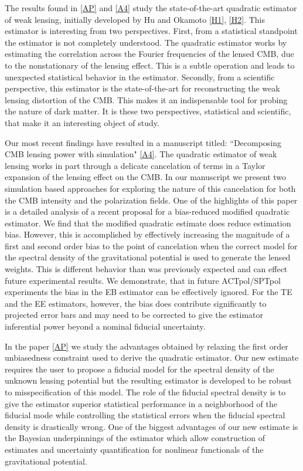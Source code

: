 \documentclass[12pt]{article}
\begin{document}
The results found in \ref{AP} and \ref{A4} study the state-of-the-art quadratic estimator of weak lensing,  initially developed by Hu and Okamoto \ref{H1}, \ref{H2}.
This estimator is interesting from two perspectives. First, from a statistical standpoint the estimator is not completely understood. The quadratic estimator works by estimating the correlation across the Fourier frequencies of the lensed CMB, due to the nonstationary of the lensing effect. This is a subtle operation and leads to unexpected statistical behavior in the estimator. Secondly, from a scientific perspective, this estimator is the state-of-the-art for reconstructing the weak lensing distortion of the CMB. This makes it an indispensable tool for probing the nature of dark matter. It is these two perspectives, statistical and scientific, that make it an interesting object of study.

Our most recent findings  have resulted in a manuscript titled: ``Decomposing CMB lensing power with simulation" \ref{A4}. The quadratic estimator of weak lensing works in part through a delicate cancelation of terms in a Taylor expansion of the lensing effect on the CMB. In our manuscript we present two simulation based approaches for exploring the nature of this cancelation for both the CMB intensity and the polarization fields. One of the highlights of this paper is a detailed analysis of a recent proposal for a bias-reduced modified quadratic estimator.  We find that the modified quadratic estimate does reduce estimation bias. However, this is accomplished by effectively increasing the magnitude of a first and second order bias to the point of cancelation when the correct model for the spectral density of the gravitational potential is used to generate the lensed weights. This is different behavior than was previously expected and can effect future experimental results. We demonstrate, that in future ACTpol/SPTpol experiments  the bias in the EB estimator can be effectively ignored. For the TE and the EE estimators, however, the bias does contribute significantly to projected error bars and may need to be corrected to give the estimator inferential power beyond a nominal fiducial uncertainty.


 In the paper \ref{AP} we study the advantages obtained by relaxing the first order unbiasedness constraint used to derive the quadratic estimator. Our new estimate requires the user to propose a fiducial model for the spectral density of the unknown lensing potential but the resulting estimator is developed to be robust to misspecification of this model. The role of the fiducial spectral density is to give the estimator superior statistical performance in a neighborhood of the fiducial mode while controlling the statistical errors when the fiducial spectral density is drastically wrong. One of the biggest advantages of our new estimate is the Bayesian underpinnings of the estimator which allow construction of estimates and uncertainty quantification for nonlinear functionals  of the gravitational potential.
\end{document}
